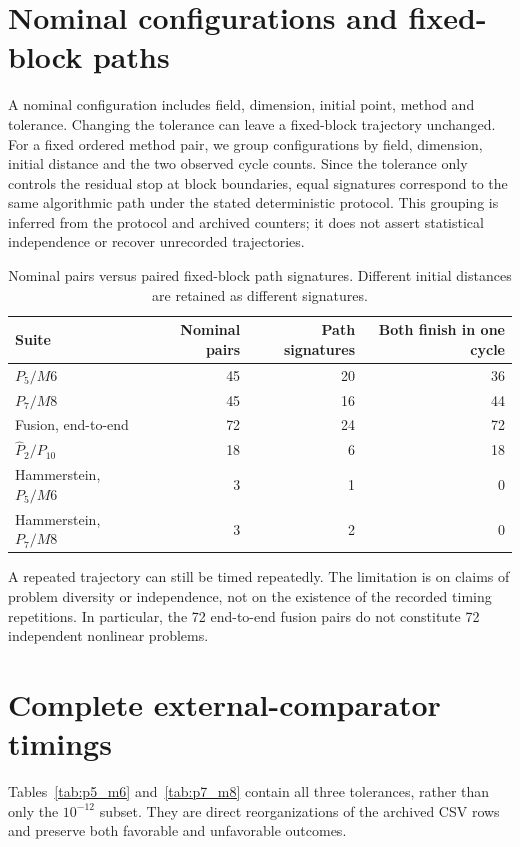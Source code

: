 \documentclass[11pt]{article}
\begin{document}
\section{Nominal configurations and fixed-block paths}\label{sec:nominal-paths}
A nominal configuration includes field, dimension, initial point, method and tolerance. Changing the tolerance can leave a fixed-block trajectory unchanged. For a fixed ordered method pair, we group configurations by field, dimension, initial distance and the two observed cycle counts. Since the tolerance only controls the residual stop at block boundaries, equal signatures correspond to the same algorithmic path under the stated deterministic protocol. This grouping is inferred from the protocol and archived counters; it does not assert statistical independence or recover unrecorded trajectories.

\begin{table}[htbp]\centering\small
\caption{Nominal pairs versus paired fixed-block path signatures. Different initial distances are retained as different signatures.}\label{tab:path-signatures}
\begin{tabular}{lrrr}\toprule
Suite & Nominal pairs & Path signatures & Both finish in one cycle\\\midrule
$P_5/M6$ & 45 & 20 & 36\\
$P_7/M8$ & 45 & 16 & 44\\
Fusion, end-to-end & 72 & 24 & 72\\
$\widehat P_2/P_{10}$ & 18 & 6 & 18\\
Hammerstein, $P_5/M6$ & 3 & 1 & 0\\
Hammerstein, $P_7/M8$ & 3 & 2 & 0\\
\bottomrule\end{tabular}
\end{table}
A repeated trajectory can still be timed repeatedly. The limitation is on claims of problem diversity or independence, not on the existence of the recorded timing repetitions. In particular, the 72 end-to-end fusion pairs do not constitute 72 independent nonlinear problems.

\clearpage
\section{Complete external-comparator timings}
Tables~\ref{tab:p5_m6} and~\ref{tab:p7_m8} contain all three tolerances, rather than only the $10^{-12}$ subset. They are direct reorganizations of the archived CSV rows and preserve both favorable and unfavorable outcomes.


\end{document}
